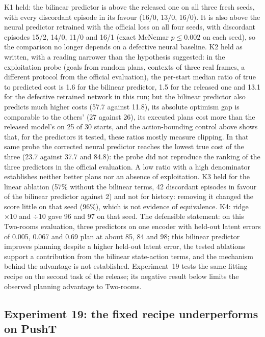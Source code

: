 \documentclass[11pt,a4paper]{article}
\begin{document}
K1 held: the bilinear predictor is above the released one on all three fresh seeds, with every discordant episode in its favour (16/0, 13/0, 16/0). It is also above the neural predictor retrained with the official loss on all four seeds, with discordant episodes 15/2, 14/0, 11/0 and 16/1 (exact McNemar $p \le 0.002$ on each seed), so the comparison no longer depends on a defective neural baseline. K2 held as written, with a reading narrower than the hypothesis suggested: in the exploitation probe (goals from random plans, contexts of three real frames, a different protocol from the official evaluation), the per-start median ratio of true to predicted cost is 1.6 for the bilinear predictor, 1.5 for the released one and 13.1 for the defective retrained network in this run; but the bilinear predictor also predicts much higher costs (57.7 against 11.8), its absolute optimism gap is comparable to the others' (27 against 26), its executed plans cost more than the released model's on 25 of 30 starts, and the action-bounding control above shows that, for the predictors it tested, these ratios mostly measure clipping. In that same probe the corrected neural predictor reaches the lowest true cost of the three (23.7 against 37.7 and 84.8): the probe did not reproduce the ranking of the three predictors in the official evaluation. A low ratio with a high denominator establishes neither better plans nor an absence of exploitation. K3 held for the linear ablation (57\% without the bilinear terms, 42 discordant episodes in favour of the bilinear predictor against 2) and not for history: removing it changed the score little on that seed (96\%), which is not evidence of equivalence. K4: ridge $\times 10$ and $\div 10$ gave 96 and 97 on that seed. The defensible statement: on this Two-rooms evaluation, three predictors on one encoder with held-out latent errors of 0.005, 0.067 and 0.69 plan at about 85, 84 and 98; this bilinear predictor improves planning despite a higher held-out latent error, the tested ablations support a contribution from the bilinear state-action terms, and the mechanism behind the advantage is not established. Experiment~19 tests the same fitting recipe on the second task of the release; its negative result below limits the observed planning advantage to Two-rooms.

\subsection{Experiment 19: the fixed recipe underperforms on PushT}
\label{sec:pusht}
\end{document}
